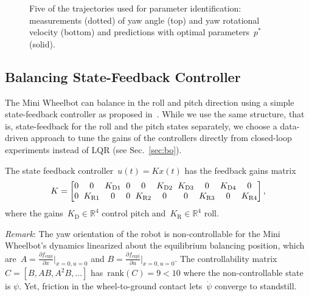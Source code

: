 \begin{figure}[thpb]
    \centering
    
    \caption{Five of the trajectories used for parameter identification: measurements (dotted) of yaw angle (top) and yaw rotational velocity (bottom) and predictions with optimal parameters~$p^*$ (solid).}
    \label{fig:sysid}
\end{figure}


\subsection{Balancing State-Feedback Controller}
\label{sec:statefeedback}
The Mini Wheelbot can balance in the roll and pitch direction using a simple state-feedback controller as proposed in~\cite{geist2022wheelbot}.
While we use the same structure, that is, state-feedback for the roll and the pitch states separately, we choose a data-driven approach to tune the gains of the controllers directly from closed-loop experiments instead of LQR (see Sec.~\ref{sec:bo}).

The state feedback controller~$u(t) = Kx(t)$ has the feedback gains matrix
\begin{align}
    \setlength\arraycolsep{3pt}
    K = \begin{bmatrix}
        0 &  0  & K_\text{D1} & 0 & 0   & K_\text{D2}   & K_\text{D3} & 0   & K_\text{D4} & 0 \\
        0 & K_\text{R1} & 0   & 0 & K_\text{R2} & 0   & 0 & K_\text{R3} & 0   & K_\text{R4}
    \end{bmatrix},
    \label{eqn:feedbackgain}
\end{align}
where the gains~$K_\text{D}\in\mathbb{R}^4$ control pitch and~$K_\text{R}\in\mathbb{R}^4$ roll.

\textit{Remark}: The yaw orientation of the robot is non-controllable for the Mini Wheelbot's dynamics linearized about the equilibrium balancing position, which are~$A=\tfrac{\partial f_\text{expl}}{\partial x} |_{x=0,u=0}$ and $B=\tfrac{\partial f_\text{expl}}{\partial u}|_{x=0,u=0}$.
The controllability matrix~$C=[B, AB, A^2B,\dots]$ has~$\text{rank}(C)=9 < 10$ where the non-controllable state is $\psi$.
Yet, friction in the wheel-to-ground contact lets~$\dot{\psi}$ converge to standstill.




